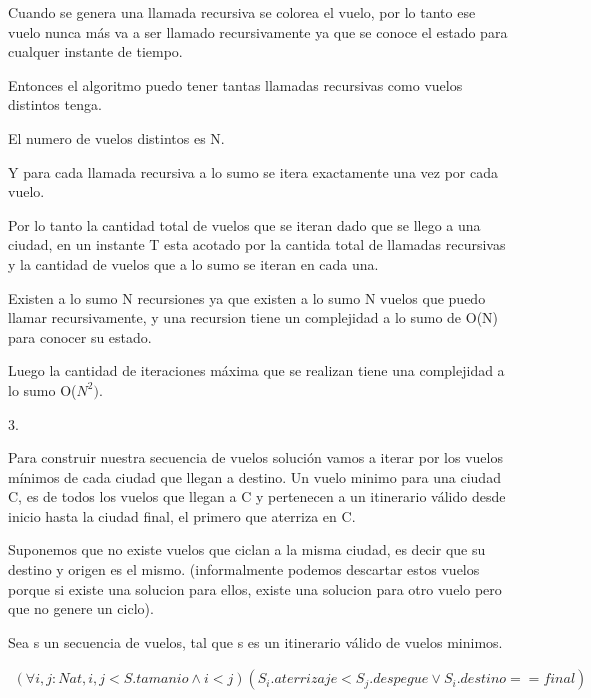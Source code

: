 Cuando se genera una llamada recursiva se colorea el vuelo, por lo tanto ese vuelo nunca m\'as va a ser llamado recursivamente ya que se conoce el estado para cualquer instante de tiempo.

Entonces el algoritmo puedo tener tantas llamadas recursivas como vuelos distintos tenga.

El numero de vuelos distintos es N.

Y para cada llamada recursiva a lo sumo se itera exactamente una vez por cada vuelo.

Por lo tanto la cantidad total de vuelos que se iteran dado que se llego a una ciudad, en un instante T esta acotado por la cantida total de llamadas recursivas y la cantidad de vuelos que a lo sumo se iteran en cada una.

Existen a lo sumo N recursiones ya que existen a lo sumo N vuelos que puedo llamar recursivamente, y una recursion tiene un complejidad a lo sumo de O(N) para conocer su estado.

Luego la cantidad de iteraciones m\'axima que se realizan tiene una complejidad a lo sumo O($N^{2})$.

3.

Para construir nuestra secuencia de vuelos soluci\'on vamos a iterar por los vuelos m\'inimos de cada ciudad que llegan a destino.
Un vuelo minimo para una ciudad C, es de todos los vuelos que llegan a C y pertenecen a un itinerario v\'alido desde inicio hasta la ciudad final, el primero que aterriza en C. 



Suponemos que no existe vuelos que ciclan a la misma ciudad, es decir que su destino y origen es el mismo. (informalmente podemos descartar estos vuelos porque si existe una solucion para ellos, existe una solucion para otro vuelo pero que no genere un ciclo).

Sea s un secuencia de vuelos, tal que s es un itinerario v\'alido de vuelos minimos.

\begin{align*}
(\forall i,j:Nat, i,j<S.tamanio \wedge i<j)(S_{i}.aterrizaje < S_{j}.despegue
\vee S_{i}.destino == final)
\end{align*}

